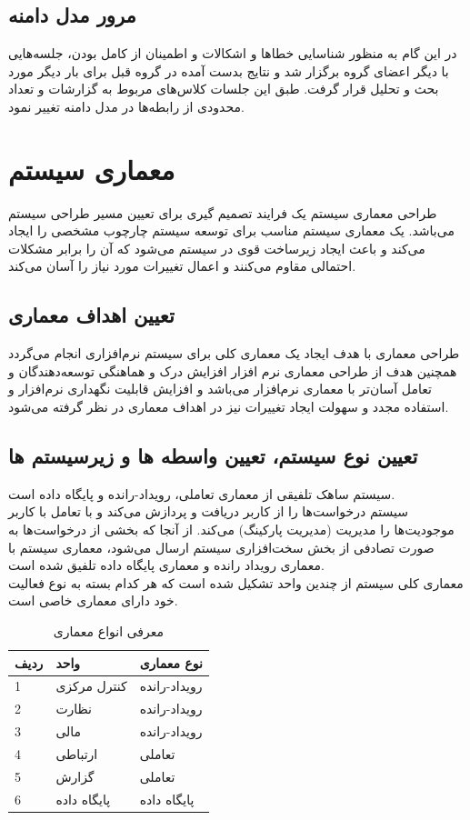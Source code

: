 \documentclass[oneside,a4paper,12pt]{book}
\begin{document}
	\section{مرور مدل دامنه}
	در این گام به منظور شناسایی خطاها و اشکالات و اطمینان از کامل بودن، جلسه‌هایی با دیگر اعضای گروه برگزار شد و
	نتایج بدست آمده در گروه قبل برای بار دیگر مورد بحث و تحلیل قرار گرفت. طبق این جلسات کلاس‌های مربوط به
	گزارشات و تعداد محدودی از رابطه‌ها در مدل دامنه تغییر نمود.
	
	\chapter{معماری سیستم}
	طراحی معماری سیستم یک فرایند تصمیم گیری برای تعیین مسیر طراحی سیستم می‌باشد. یک معماری سیستم
	مناسب برای توسعه سیستم چارچوب مشخصی را ایجاد می‌کند و باعث ایجاد زیرساخت قوی در سیستم می‌شود که آن
	را برابر مشکلات احتمالی مقاوم می‌کنند و اعمال تغییرات مورد نیاز را آسان می‌کند.
	
	\section{تعیین اهداف معماری}
	طراحی معماری با هدف ایجاد یک معماری کلی برای سیستم نرم‌افزاری انجام می‌گردد همچنین هدف از طراحی
	معماری نرم افزار افزایش درک و هماهنگی توسعه‌دهندگان و تعامل آسان‌تر با معماری نرم‌‍افزار می‌باشد و افزایش قابلیت
	نگهداری نرم‌افزار و استفاده مجدد و سهولت ایجاد تغییرات نیز در اهداف معماری در نظر گرفته می‌شود.
	
	\section{تعیین نوع سیستم، تعیین واسطه ها و زیرسیستم ها}
	\noindent
	سیستم ساهک تلفیقی از معماری تعاملی، رویداد-رانده و پایگاه داده است. \\
	سیستم درخواست‌ها را از کاربر دریافت و پردازش می‌کند و با تعامل با کاربر موجودیت‌ها را مدیریت (مدیریت پارکینگ) می‌کند. از آنجا که بخشی از درخواست‌ها به صورت تصادفی از بخش سخت‌افزاری سیستم ارسال می‌شود، معماری سیستم با معماری رویداد رانده و معماری پایگاه داده تلفیق شده است.\\
	\noindent
	معماری کلی سیستم از چندین واحد تشکیل شده است که هر کدام بسته به نوع فعالیت خود دارای معماری خاصی است.
	\begin{table}
		\begin{center}
			\begin{tabular}{|p{1cm}|p{5cm}|p{5cm}|}
				\hline
				\textbf{ردیف} & \textbf{واحد} & \textbf{نوع معماری} \\
				\hline
				1 & کنترل مرکزی & رویداد-رانده \\
				\hline
				2 & نظارت & رویداد-رانده \\
				\hline
				3 & مالی & رویداد-رانده \\
				\hline
				4 & ارتباطی & تعاملی \\
				\hline
				5 & گزارش & تعاملی \\
				\hline
				6 & پایگاه داده & پایگاه داده \\
				\hline
			\end{tabular}
		\end{center}
		\caption{معرفی انواع معماری}
	\end{table}
	
\end{document}
